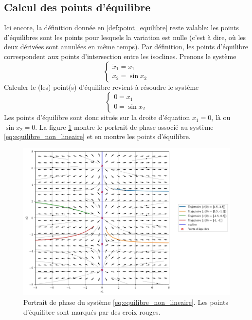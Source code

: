         \subsection{Calcul des points d'équilibre}
            Ici encore, la définition donnée en \ref{def:point_equilibre} reste valable: les points d'équilibres sont les points pour lesquels la variation est nulle (c'est à dire, où les deux dérivées sont annulées en même temps). Par définition, les points d'équilibre correspondent aux points d'intersection entre les isoclines.
            Prenons le système
            \begin{equation}\label{eq:equilibre_non_lineaire}
                \begin{cases}
                    \dot{x}_1 = x_1 \\
                    \dot{x}_2 = \sin{x_2}
                \end{cases}
            \end{equation}
            Calculer le (les) point(s) d'équilibre revient à résoudre le système
            \begin{equation}
                \begin{cases}
                    0 = x_1 \\
                    0 = \sin{x_2}
                \end{cases}
            \end{equation}
            Les points d'équilibre sont donc situés sur la droite d'équation $x_1 = 0$, là ou $\sin x_2 = 0$. La figure \ref{fig:equilibre_non_lineaire_2} montre le portrait de phase associé au système \ref{eq:equilibre_non_lineaire} et en montre les points d'équilibre.
            \begin{figure}[ht!]
                \centering
                \includegraphics[width=\textwidth]{images/exemple_non_lineaire_2.jpg}
                \caption{Portrait de phase du système \ref{eq:equilibre_non_lineaire}. Les points d'équilibre sont marqués par des croix rouges.}
                \label{fig:equilibre_non_lineaire_2}
            \end{figure}
            
